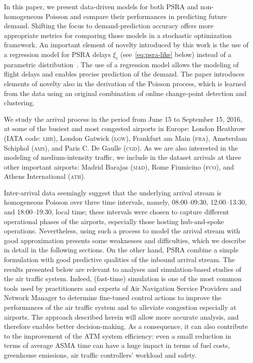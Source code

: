 \documentclass[draft,review]{elsarticle}
\newcommand{\airp}[1]{\textcolor{#1}{\textsc{#1}}}
\begin{document}
In this paper, we present data-driven models for both \ac{PSRA} and non-homo\-geneous Poisson and compare their performances in predicting future demand.
Shifting the focus to demand-prediction accuracy offers more appropriate metrics for comparing those models in a stochastic optimization framework.
An important element of novelty introduced by this work is the use of a regression model for \ac{PSRA} delays \(\xi_i\) (see~\eqref{eq:psra-like} below) instead of a parametric  distribution~\citep{ball1,guadagni2011queueing,nikoleris2012queueing}.
The use of a regression model allows the modeling of flight delays and enables precise prediction of the demand.
The paper introduces elements of novelty also in the derivation of the Poisson process, which is learned from the data using an original combination of online change-point detection and clustering.

We study the arrival process in the period from June 15 to September 15, 2016, at some of the busiest and most congested airports in Europe: London Heathrow (\ac{IATA} code: \airp{lhr}), London Gatwick (\airp{lgw}), Frankfurt am Main (\airp{fra}), Amsterdam Schiphol (\airp{ams}), and Paris C. De Gaulle (\airp{cgd}).
As we are also interested in the modeling of medium-intensity traffic, we include in the dataset arrivals at three other important airports: Madrid Barajas (\airp{mad}), Rome Fiumicino (\airp{fco}), and Athens International (\airp{ath}).

Inter-arrival data seemingly suggest that the underlying arrival stream is homogeneous Poisson over three time intervals, namely, 08:00–09:30, 12:00–13:30,
and 18:00–19:30, local time; these intervals were chosen to capture different operational
phases of the airports, especially those hosting
hub-and-spoke operations.
Nevertheless, using such a process to model the arrival stream with good approximation presents some weaknesses and difficulties, which we describe in detail in the following sections.
On the other hand, \ac{PSRA} combine a simple formulation with good predictive qualities of the inbound arrival stream.
The results presented below are relevant to analyses and simulation-based studies of the air traffic system.
Indeed, (fast-time) simulation is one of the most common tools used by practitioners and experts of Air Navigation Service Providers and Network Manager to determine fine-tuned control actions to improve the performances of the air traffic system and to alleviate congestion especially at airports.
The approach described herein will allow more accurate analysis, and therefore enables better decision-making.
As a consequence, it can also contribute to the improvement of the ATM system efficiency: even a small reduction in terms of average \ac{ASMA} time can have a huge impact in terms of fuel costs, greenhouse emissions, air traffic controllers' workload and safety.
\end{document}
